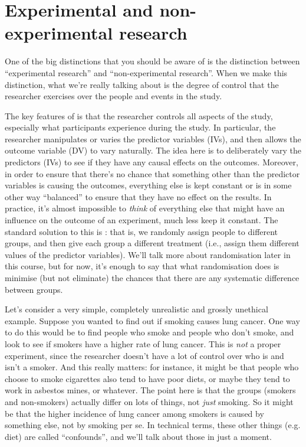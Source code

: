 \section{Experimental and non-experimental research~\label{sec:researchdesigns}}

One of the big distinctions that you should be aware of is the distinction between ``experimental research'' and ``non-experimental research''. When we make this distinction, what we're really talking about is the degree of control that the researcher exercises over the people and events in the study.


The key features of  is that the researcher controls all aspects of the study, especially what participants experience during the study. In particular, the researcher manipulates or varies the predictor variables (IVs), and then allows the outcome variable (DV) to vary naturally. The idea here is to deliberately vary the predictors (IVs) to see if they have any causal effects on the outcomes. Moreover, in order to ensure that there's no chance that something other than the predictor variables is causing the outcomes, everything else is kept constant or is in some other way ``balanced'' to ensure that they have no effect on the results. In practice, it's almost impossible to {\it think} of everything else that might have an influence on the outcome of an experiment, much less keep it constant. The standard solution to this is : that is, we randomly assign people to different groups, and then give each group a different treatment (i.e., assign them different values of the predictor variables). We'll talk more about randomisation later in this course, but for now, it's enough to say that what randomisation does is minimise (but not eliminate) the chances that there are any systematic difference between groups. 

Let's consider a very simple, completely unrealistic and grossly unethical example. Suppose you wanted to find out if smoking causes lung cancer. One way to do this would be to find people who smoke and people who don't smoke, and look to see if smokers have a higher rate of lung cancer. This is {\it not} a proper experiment, since the researcher doesn't have a lot of control over who is and isn't a smoker. And this really matters: for instance, it might be that people who choose to smoke cigarettes also tend to have poor diets, or maybe they tend to work in asbestos mines, or whatever. The point here is that the groups (smokers and non-smokers) actually differ on lots of things, not {\it just} smoking. So it might be that the higher incidence of lung cancer among smokers is caused by something else, not by smoking per se. In technical terms, these other things (e.g. diet) are called ``confounds'', and we'll talk about those in just a moment. 

